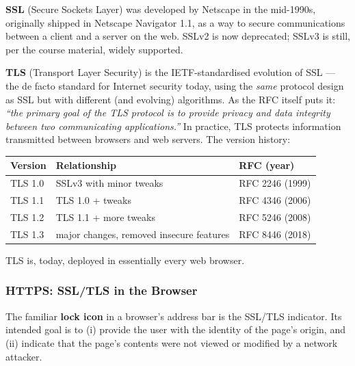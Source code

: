 \documentclass[12pt, a4paper]{article}
\begin{document}
\textbf{SSL} (Secure Sockets Layer) was developed by Netscape in the mid-1990s, originally shipped in Netscape Navigator 1.1, as a way to secure communications between a client and a server on the web. SSLv2 is now deprecated; SSLv3 is still, per the course material, widely supported.

\textbf{TLS} (Transport Layer Security) is the IETF-standardised evolution of SSL --- the de facto standard for Internet security today, using the \emph{same} protocol design as SSL but with different (and evolving) algorithms. As the RFC itself puts it: \textit{``the primary goal of the TLS protocol is to provide privacy and data integrity between two communicating applications.''} In practice, TLS protects information transmitted between browsers and web servers. The version history:

\begin{center}
\begin{tabular}{@{}lll@{}}
\toprule
\textbf{Version} & \textbf{Relationship} & \textbf{RFC (year)} \\
\midrule
TLS 1.0 & SSLv3 with minor tweaks & RFC 2246 (1999) \\
TLS 1.1 & TLS 1.0 + tweaks & RFC 4346 (2006) \\
TLS 1.2 & TLS 1.1 + more tweaks & RFC 5246 (2008) \\
TLS 1.3 & major changes, removed insecure features & RFC 8446 (2018) \\
\bottomrule
\end{tabular}
\end{center}
TLS is, today, deployed in essentially every web browser.

\subsubsection{HTTPS: SSL/TLS in the Browser}
The familiar \textbf{lock icon} in a browser's address bar is the SSL/TLS indicator. Its intended goal is to (i) provide the user with the identity of the page's origin, and (ii) indicate that the page's contents were not viewed or modified by a network attacker.
\end{document}
